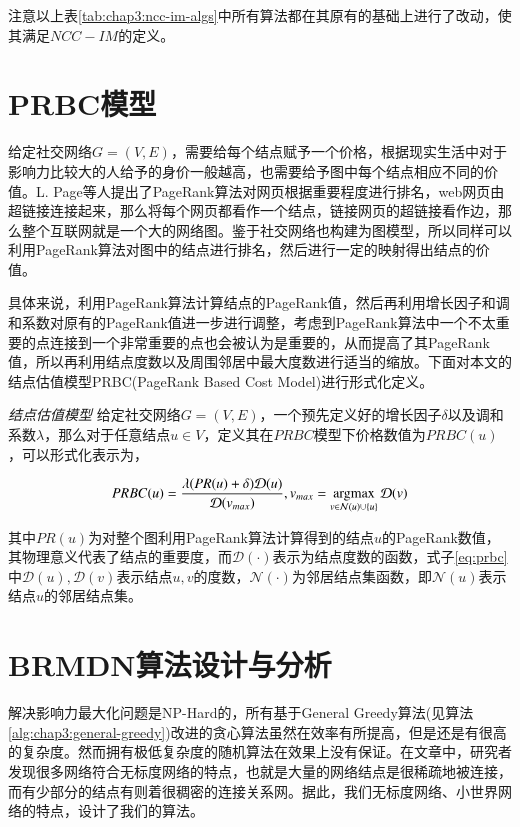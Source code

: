 注意以上表\ref{tab:chap3:ncc-im-algs}中所有算法都在其原有的基础上进行了改动，使其满足$NCC-IM$的定义。


\section{PRBC模型}
\label{sec:chap3:cost-model}
给定社交网络$G=(V, E)$，需要给每个结点赋予一个价格，根据现实生活中对于影响力比较大的人给予的身价一般越高，也需要给予图中每个结点相应不同的价值。L. Page\cite{page1999pagerank}等人提出了PageRank算法对网页根据重要程度进行排名，web网页由超链接连接起来，那么将每个网页都看作一个结点，链接网页的超链接看作边，那么整个互联网就是一个大的网络图。鉴于社交网络也构建为图模型，所以同样可以利用PageRank算法对图中的结点进行排名，然后进行一定的映射得出结点的价值。


具体来说，利用PageRank算法计算结点的PageRank值，然后再利用增长因子和调和系数对原有的PageRank值进一步进行调整，考虑到PageRank算法中一个不太重要的点连接到一个非常重要的点也会被认为是重要的，从而提高了其PageRank值，所以再利用结点度数以及周围邻居中最大度数进行适当的缩放。下面对本文的结点估值模型PRBC(PageRank Based Cost Model)进行形式化定义。
\begin{definition}
\emph{结点估值模型}
给定社交网络$G=(V, E)$，一个预先定义好的增长因子$\delta$以及调和系数$\lambda$，那么对于任意结点$u \in V$，定义其在$PRBC$模型下价格数值为$PRBC(u)$，可以形式化表示为，

\begin{equation}
\label{eq:prbc}
PRBC(u) = \frac{\lambda(PR(u) + \delta) \mathcal{D}(u)}{\mathcal{D}(v_{max})},v_{max} = \mathop{\rm argmax} \limits_{v \in \mathcal{N}(u) \cup \{u\}}\mathcal{D}(v)
\end{equation}

其中$PR(u)$为对整个图利用PageRank算法计算得到的结点$u$的PageRank数值，其物理意义代表了结点的重要度，而$\mathcal{D}(\cdot)$表示为结点度数的函数，式子\ref{eq:prbc}中$\mathcal{D}(u), \mathcal{D}(v)$表示结点$u, v$的度数，$\mathcal{N}(\cdot)$为邻居结点集函数，即$\mathcal{N}(u)$表示结点$u$的邻居结点集。
\end{definition}



\section{BRMDN算法设计与分析}
解决影响力最大化问题是NP-Hard的，所有基于General Greedy算法(见算法\ref{alg:chap3:general-greedy})改进的贪心算法虽然在效率有所提高，但是还是有很高的复杂度。然而拥有极低复杂度的随机算法在效果上没有保证。在文章\cite{barabasi1999emergence}\cite{adamic2000power}\cite{watts1998collective}中，研究者发现很多网络符合无标度网络的特点，也就是大量的网络结点是很稀疏地被连接，而有少部分的结点有则着很稠密的连接关系网。据此，我们无标度网络、小世界网络的特点，设计了我们的算法。

